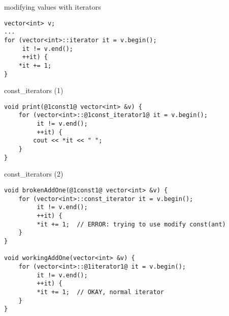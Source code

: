 \begin{frame}[fragile,label=modWithIt]{modifying values with iterators}
\lstset{language=C++,style=small}
\begin{lstlisting}
vector<int> v;
...
for (vector<int>::iterator it = v.begin();
     it != v.end();
     ++it) {
    *it += 1;
}
\end{lstlisting}
\end{frame}

\begin{frame}[fragile,label=constIt1]{const\_iterators (1)}
\begin{lstlisting}
void print(@1const1@ vector<int> &v) {
    for (vector<int>::@1const_iterator1@ it = v.begin();
         it != v.end();
         ++it) {
        cout << *it << " ";
    }
}
\end{lstlisting}
\end{frame}

\begin{frame}[fragile,label=constIt2]{const\_iterators (2)}
\begin{lstlisting}
void brokenAddOne(@1const1@ vector<int> &v) {
    for (vector<int>::const_iterator it = v.begin();
         it != v.end();
         ++it) {
         *it += 1;  // ERROR: trying to use modify const(ant)
    }
}

void workingAddOne(vector<int> &v) {
    for (vector<int>::@1iterator1@ it = v.begin();
         it != v.end();
         ++it) {
         *it += 1;  // OKAY, normal iterator
    }
}
\end{lstlisting}
\end{frame}
